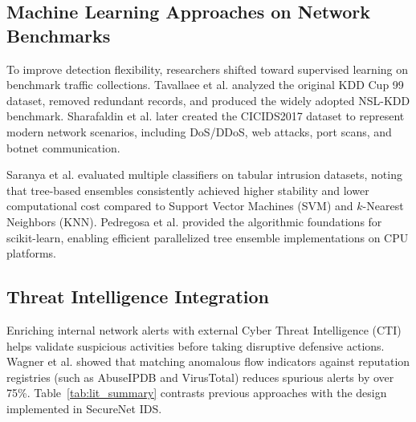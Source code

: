 \documentclass[conference]{IEEEtran}
\begin{document}
\subsection{Machine Learning Approaches on Network Benchmarks}
To improve detection flexibility, researchers shifted toward supervised learning on benchmark traffic collections. Tavallaee et al. \cite{tavallaee2009} analyzed the original KDD Cup 99 dataset, removed redundant records, and produced the widely adopted NSL-KDD benchmark. Sharafaldin et al. \cite{sharafaldin2018} later created the CICIDS2017 dataset to represent modern network scenarios, including DoS/DDoS, web attacks, port scans, and botnet communication.

Saranya et al. \cite{saranya2020} evaluated multiple classifiers on tabular intrusion datasets, noting that tree-based ensembles consistently achieved higher stability and lower computational cost compared to Support Vector Machines (SVM) and $k$-Nearest Neighbors (KNN). Pedregosa et al. \cite{pedregosa2011} provided the algorithmic foundations for scikit-learn, enabling efficient parallelized tree ensemble implementations on CPU platforms.

\subsection{Threat Intelligence Integration}
Enriching internal network alerts with external Cyber Threat Intelligence (CTI) helps validate suspicious activities before taking disruptive defensive actions. Wagner et al. \cite{wagner2016} showed that matching anomalous flow indicators against reputation registries (such as AbuseIPDB and VirusTotal) reduces spurious alerts by over 75\%. Table~\ref{tab:lit_summary} contrasts previous approaches with the design implemented in SecureNet IDS.
\end{document}
